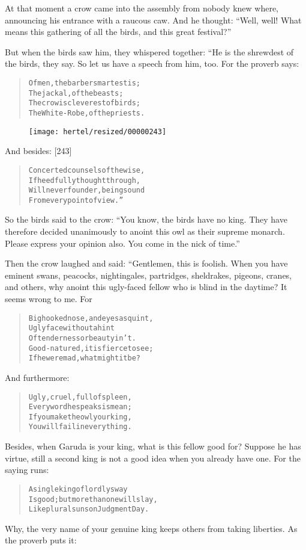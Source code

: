 \documentclass[article, twoside, 10pt]{memoir}
\renewenvironment{verbatim}{%
\begin{quote}%
\vskip -10pt%
\begin{alltt}\normalfont\small}{\end{alltt}%
\end{quote}%
\vskip -10pt
} %
\begin{document}
At that moment a crow came into the assembly from nobody knew
where, announcing his entrance with a raucous caw. And he thought:
``Well, well! What means this gathering of all the birds, and this great festival?''

But when the birds saw him, they whispered together: “He is the
shrewdest of the birds, they say. So let us have a speech from him,
too. For the proverb says:

\begin{verbatim}
Of men, the barber smartest is;
    The jackal, of the beasts;
The crow is cleverest of birds;
    The White-Robe, of the priests.
\end{verbatim}
\begin{figure}[p]\texttt{[image: hertel/resized/00000243]}\end{figure}And besides: [243]

\begin{verbatim}
Concerted counsels of the wise,
    If heedfully thought through,
Will never founder, being sound
    From every point of view.”
\end{verbatim}
So the birds said to the crow:
``You know, the birds have no king. They have therefore decided unanimously to anoint this owl as their supreme monarch. Please express your opinion also. You come in the nick of time.''

Then the crow laughed and said: “Gentlemen, this is foolish. When
you have eminent swans, peacocks, nightingales, partridges,
sheldrakes, pigeons, cranes, and others, why anoint this ugly-faced
fellow who is blind in the daytime? It seems wrong to me. For

\begin{verbatim}
Big hooked nose, and eyes asquint,
Ugly face without a hint
Of tenderness or beauty in 't.
Good-natured, it is fierce to see;
If he were mad, what might it be?
\end{verbatim}
And furthermore:

\begin{verbatim}
Ugly, cruel, full of spleen,
Every word he speaks is mean;
If you make the owl your king,
You will fail in everything.
\end{verbatim}
Besides, when Garuda is your king, what is this fellow good for?
Suppose he has virtue, still a second king is not a good idea when
you already have one. For the saying runs:

\begin{verbatim}
A single king of lordly sway
Is good; but more than one will slay,
Like plural suns on Judgment Day.
\end{verbatim}
Why, the very name of your genuine king keeps others from taking
liberties. As the proverb puts it:
\end{document}
